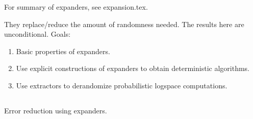 For summary of expanders, see expansion.tex.


They replace/reduce the amount of randomness needed. The results here are unconditional. Goals:
\begin{enumerate}
\item Basic properties of expanders.
\item Use explicit constructions of expanders to obtain deterministic algorithms.
\item Use extractors to derandomize probabilistic logspace computations.
\end{enumerate}
\subsection{}
\subsection{}
Error reduction using expanders.
\subsection{}
\subsection{}

